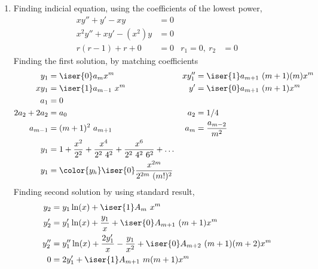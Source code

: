 \begin{enumerate}
    \item Finding indicial equation, using the coefficients of the lowest power,
          \begin{align}
              xy'' + y' - xy         & = 0   \\
              x^2 y'' + xy' - (x^2)y & = 0   \\
              r(r - 1) + r + 0       & = 0 &
              r_1 = 0,\ r_2          & = 0
          \end{align}
          Finding the first solution, by matching coefficients
          \begin{align}
              y_1         & = \iser{0} a_{m} x^{m}                                 &
              xy_1''      & = \iser{1} a_{m+1}\ (m+1)(m)x^{m}                        \\
              x y_1       & = \iser{1} a_{m-1}\ x^{m}                              &
              y'          & = \iser{0} a_{m+1}\ (m+1) x^{m}                          \\
              a_1         & = 0                                                      \\
              2a_2 + 2a_2 & = a_0                                                  &
              a_2         & = 1/4                                                    \\
              a_{m-1}     & = (m+1)^2\ a_{m+1}                                     &
              a_{m}       & = \frac{a_{m-2}}{m^2}                                    \\
              y_1         & = 1 + \frac{x^2}{2^2} + \frac{x^4}{2^2\ 4^2}
              + \frac{x^6}{2^2\ 4^2\ 6^2} + \dots                                    \\
              y_1         & = {\color{y_h} \iser{0} \frac{x^{2m}}{2^{2m}\ (m!)^2}}
          \end{align}
          Finding second solution by using standard result,
          \begin{align}
              y_2   & = y_1 \ln(x) + \iser{1}A_m\ x^m                              \\
              y_2'  & = y_1' \ln(x) + \frac{y_1}{x} + \iser{0} A_{m+1}\ (m+1)x^{m} \\
              y_2'' & = y_1'' \ln(x) + \frac{2y_1'}{x} - \frac{y_1}{x^2}
              + \iser{0}A_{m+2}\ (m+1)(m+2)x^{m}                                   \\
              0     & = 2y_1' + \iser{1}A_{m+1}\ m(m+1)x^{m}

\end{align}
\end{enumerate}
